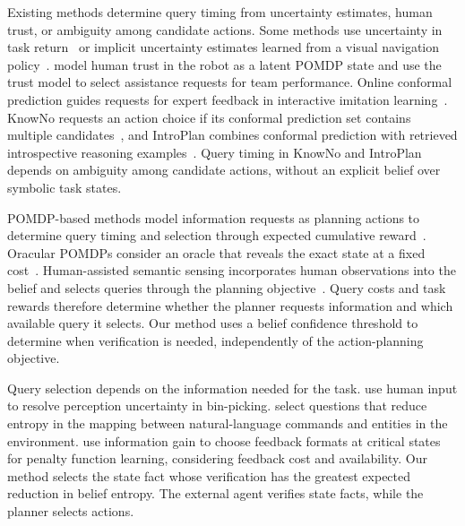 Existing methods determine query timing from uncertainty estimates, human trust, or ambiguity among candidate actions. Some methods use uncertainty in task return~\citep{singi2023hula} or implicit uncertainty estimates learned from a visual navigation policy~\citep{igbinedion2024learning}. \citet{mangalindan2025seek} model human trust in the robot as a latent POMDP state and use the trust model to select assistance requests for team performance. Online conformal prediction guides requests for expert feedback in interactive imitation learning~\citep{zhao2025conformalized}. KnowNo requests an action choice if its conformal prediction set contains multiple candidates~\citep{ren2023robots}, and IntroPlan combines conformal prediction with retrieved introspective reasoning examples~\citep{liang2024introspective}. Query timing in KnowNo and IntroPlan depends on ambiguity among candidate actions, without an explicit belief over symbolic task states.


POMDP-based methods model information requests as planning actions to determine query timing and selection through expected cumulative reward~\citep{armstrongcrews2007oracular,burks2021collaborative,burks2023harps}. Oracular POMDPs consider an oracle that reveals the exact state at a fixed cost~\citep{armstrongcrews2007oracular}. Human-assisted semantic sensing incorporates human observations into the belief and selects queries through the planning objective~\citep{burks2021collaborative,burks2023harps}. Query costs and task rewards therefore determine whether the planner requests information and which available query it selects. Our method uses a belief confidence threshold to determine when verification is needed, independently of the action-planning objective.

Query selection depends on the information needed for the task. \citet{kaipa2016addressing} use human input to resolve perception uncertainty in bin-picking. \citet{deits2013clarifying} select questions that reduce entropy in the mapping between natural-language commands and entities in the environment. \citet{anand2025adaptive} use information gain to choose feedback formats at critical states for penalty function learning, considering feedback cost and availability. Our method selects the state fact whose verification has the greatest expected reduction in belief entropy. The external agent verifies state facts, while the planner selects actions.
